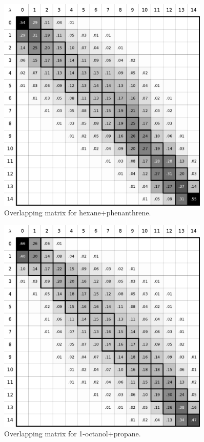 \documentclass[
	12pt,				%
	openright,			%
	oneside,			%
	a4paper,			%
	english,			%
	brazil				%
	]{abntex2}
\begin{document}
\begin{apendicesenv}
\begin{figure}[H]
	\centering
	\includegraphics[width=0.9\textwidth]{Figures/ohex_phen}
	\caption{Overlapping matrix for hexane+phenanthrene.}
\end{figure}

\begin{figure}[H]
	\centering
	\includegraphics[width=0.9\textwidth]{Figures/ooct_prop}
	\caption{Overlapping matrix for 1-octanol+propane.}
\end{figure}


\end{apendicesenv}
\end{document}
